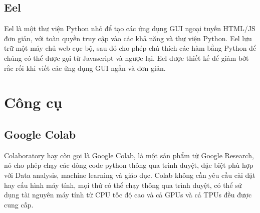 \subsection{Eel}
Eel là một thư viện Python nhỏ để tạo các ứng dụng GUI ngoại tuyến
HTML/JS đơn giản, với toàn quyền truy cập vào các khả năng và
thư viện Python. Eel lưu trữ một máy chủ web cục bộ, sau đó cho phép
chú thích các hàm bằng Python để chúng có thể được gọi từ Javascript
và ngược lại. Eel được thiết kế để giảm bớt rắc rối khi viết các
ứng dụng GUI ngắn và đơn giản.

\section{Công cụ}

\subsection{Google Colab}
Colaboratory hay còn gọi là Google Colab, là một sản phẩm từ Google
Research, nó cho phép chạy các dòng code python thông qua
trình duyệt, đặc biệt phù hợp với Data analysis, machine learning
và giáo dục. Colab không cần yêu cầu cài đặt hay cấu hình máy tính,
mọi thứ có thể chạy thông qua trình duyệt, có thể sử dụng tài nguyên
máy tính từ CPU tốc độ cao và cả GPUs và cả TPUs đều được cung cấp.
